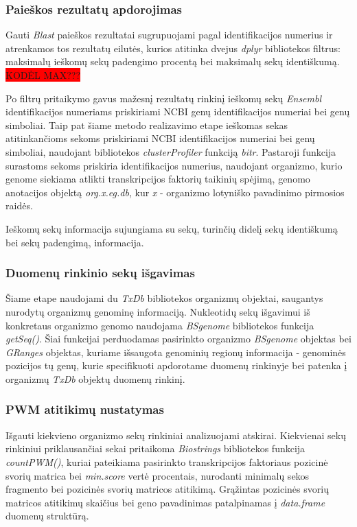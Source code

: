 \documentclass[12pt]{article}
\begin{document}
\subsubsection{Paieškos rezultatų apdorojimas}
Gauti \emph{Blast} paieškos rezultatai sugrupuojami pagal identifikacijos
numerius ir atrenkamos tos rezultatų eilutės, kurios atitinka dvejus
\emph{dplyr} bibliotekos filtrus: maksimalų ieškomų sekų padengimo procentą bei
maksimalų sekų identiškumą. \colorbox{red}{KODĖL MAX???}

Po filtrų pritaikymo gavus mažesnį rezultatų rinkinį ieškomų sekų \emph{Ensembl}
identifikacijos numeriams priskiriami NCBI genų identifikacijos numeriai bei
genų simboliai. Taip pat šiame metodo realizavimo etape ieškomas sekas
atitinkančioms sekoms priskiriami NCBI identifikacijos numeriai bei genų
simboliai, naudojant bibliotekos \emph{clusterProfiler} \cite{CLUSTERPROFILER}
funkciją \emph{bitr}. Pastaroji funkcija surastoms sekoms priskiria
identifikacijos numerius, naudojant organizmo, kurio genome siekiama atlikti
transkripcijos faktorių taikinių spėjimą, genomo anotacijos objektą
\emph{org.x.eg.db}, kur \emph{x} - organizmo lotyniško pavadinimo pirmosios
raidės.

Ieškomų sekų informacija sujungiama su sekų, turinčių didelį sekų identiškumą
bei sekų padengimą, informacija.

\subsubsection{Duomenų rinkinio sekų išgavimas}
Šiame etape naudojami du \emph{TxDb} bibliotekos organizmų objektai,
saugantys nurodytų or\-ga\-niz\-mų genominę informaciją. Nukleotidų sekų
išgavimui iš konkretaus organizmo genomo naudojama \emph{BSgenome} bibliotekos
funkcija \emph{getSeq()}. Šiai funkcijai perduodamas pasirinkto organizmo
\emph{BSgenome} objektas bei \emph{GRanges} objektas, kuriame išsaugota
genominių regionų informacija - genominės pozicijos tų genų, kurie specifikuoti
apdorotame duomenų rinkinyje bei patenka į organizmų \emph{TxDb} objektų duomenų
rinkinį.

\subsubsection{PWM atitikimų nustatymas}
Išgauti kiekvieno organizmo sekų rinkiniai analizuojami atskirai. Kiekvienai
sekų rinkiniui priklausančiai sekai pritaikoma
\emph{Biostrings} \cite{BIOSTRINGS} bibliotekos
funkcija \emph{countPWM()}, kuriai pateikiama pasirinkto transkripcijos
faktoriaus pozicinė svorių matrica bei \emph{min.score} vertė procentais,
nurodanti minimalų sekos fragmento bei pozicinės svorių matricos atitikimą.
Grąžintas pozicinės svorių matricos atitikimų skaičius bei geno pavadinimas
patalpinamas į \emph{data.frame} duomenų struktūrą.
\end{document}
